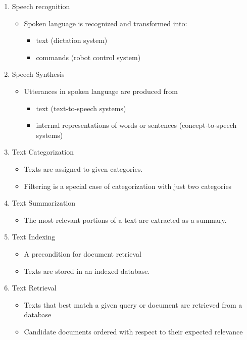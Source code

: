 \documentclass[11pt]{article}
\newenvironment{itemise}{
\begin{itemize}
  \setlength{\itemsep}{1pt}
  \setlength{\parskip}{0pt}
  \setlength{\parsep}{0pt}
}{\end{itemize}}
\begin{document}
\begin{enumerate}
 \item Speech recognition
\begin{itemise}
 \item Spoken language is recognized and transformed into:
\begin{itemise}
 \item text (dictation system)
 \item commands (robot control system)
\end{itemise}
\end{itemise}
 \item Speech Synthesis
\begin{itemise}
 \item Utterances in spoken language are produced from 
\begin{itemise}
 \item text (text-to-speech systems)
 \item internal representations of words or sentences (concept-to-speech systems)
\end{itemise}
\end{itemise}
 \item Text Categorization
\begin{itemise}
 \item Texts are assigned to given categories.
 \item Filtering is a special case of categorization with just two categories
\end{itemise}
 \item Text Summarization
\begin{itemise}
 \item The most relevant portions of a text are extracted as a summary.
\end{itemise}
 \item Text Indexing
\begin{itemise}
 \item A precondition for document retrieval
 \item Texts are stored in an indexed database.
\end{itemise}
 \item Text Retrieval
\begin{itemise}
 \item Texts that best match a given query or document are retrieved from a database
 \item Candidate documents ordered with respect to their expected relevance 
\end{itemise}

\end{enumerate}
\end{document}
